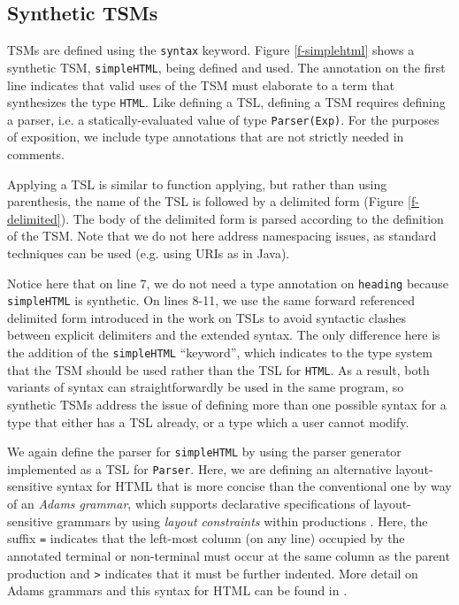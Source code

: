 \documentclass{sig-alternate}
\begin{document}

\subsection{Synthetic TSMs}
TSMs are defined using the \verb|syntax| keyword. Figure \ref{f-simplehtml} shows a synthetic TSM, \verb|simpleHTML|, being defined and used. The annotation on the first line indicates that valid uses of the TSM must elaborate to a term that synthesizes the type \verb|HTML|. Like defining a TSL, defining a TSM requires defining a parser, i.e. a statically-evaluated value of type \verb|Parser(Exp)|. For the purposes of exposition, we include type annotations that are not strictly needed in comments. 

Applying a TSL is similar to function applying, but rather than using parenthesis, the name of the TSL is followed by a delimited form (Figure \ref{f-delimited}). The body of the delimited form is parsed according to the definition of the TSM. Note that we do not here address namespacing issues, as standard techniques can be used (e.g. using URIs as in Java). 

Notice here that on line 7, we do not need a type annotation on \verb|heading| because \verb|simpleHTML| is synthetic. On lines 8-11, we use the same forward referenced delimited form introduced in the work on TSLs to avoid syntactic clashes between explicit delimiters and the extended syntax. The only difference here is the addition of the \verb|simpleHTML| ``keyword'', which indicates to the type system that the TSM should be used rather than the TSL for \verb|HTML|. As a result, both variants of syntax can straightforwardly be used in the same program, so synthetic TSMs address the issue of defining more than one possible syntax for a type that either has a TSL  already, or a type which a user cannot modify.

We again define the parser for \verb|simpleHTML| by using the parser generator implemented as a TSL for \verb|Parser|. Here, we are defining an alternative layout-sensitive syntax for HTML that is more concise than the conventional one by way of an \emph{Adams grammar}, which supports declarative specifications of layout-sensitive grammars by using \emph{layout constraints} within productions \cite{Adams:2013:PPI:2429069.2429129}. Here, the suffix \verb|=| indicates that the left-most column (on any line) occupied by the annotated terminal or non-terminal must occur at the same column as the parent production and \verb|>| indicates that it must be further indented. More detail on Adams grammars and this syntax for HTML can be found in \cite{TSLs}. 
\end{document}
